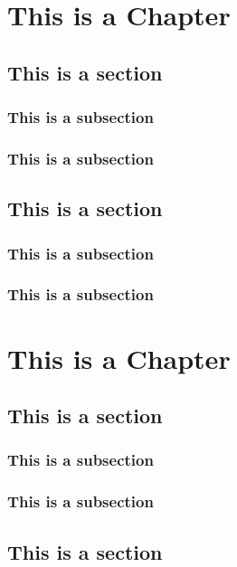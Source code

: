 \documentclass[11pt,oneside]{book}
\begin{document}


\tableofcontents

\chapter{This is a Chapter}
\section{This is a section}
\subsection{This is a subsection}
\lipsum[1-3]

\subsection{This is a subsection}
\lipsum[1-2]

\section{This is a section}
\subsection{This is a subsection}
\lipsum[1-1]
\subsection{This is a subsection}
\lipsum[1-2]


\chapter{This is a Chapter}
\section{This is a section}
\subsection{This is a subsection}
\lipsum[1-3]

\subsection{This is a subsection}
\lipsum[1-2]

\section{This is a section}
\end{document}

